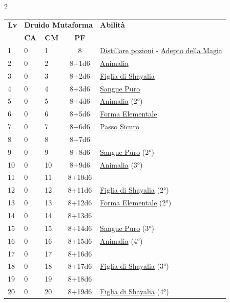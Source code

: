 {\begin{multicols}{2}


\noindent\begin{tabularx}{\linewidth}{p{0.55cm}|p{0.55cm}p{0.55cm}c|X|}
	\toprule
 \rowcolor{gray!20}	\textbf{Lv} & \multicolumn{3}{c|}{\textbf{Druido Mutaforma}} & \textbf{Abilità} \\
& \centering\arraybackslash \textbf{CA} & \centering\arraybackslash \textbf{CM} & \centering\arraybackslash \textbf{PF} & \\
	\toprule
	1 & 0 & 1 & 8 & \hyperlink{Distillare pozioni}{Distillare pozioni} - \hyperlink{Adepto della Magia}{Adepto della Magia}\\
	\rowcolor{gray!20}2 & 0 & 2 & 8+1d6 & \hyperlink{Animalia}{Animalia}\\
	3 & 0 & 3 & 8+2d6 & \hyperlink{Figlia di Shayalia}{Figlia di Shayalia}\\
	\rowcolor{gray!20}4 & 0 & 4 & 8+3d6 & \hyperlink{Sangue Puro}{Sangue Puro}\\
	5 & 0 & 5 & 8+4d6 & \hyperlink{Animalia}{Animalia} (2°)\\
	\rowcolor{gray!20}6 & 0 & 6 & 8+5d6 & \hyperlink{Forma Elementale}{Forma Elementale}\\
	7 & 0 & 7 & 8+6d6 & \hyperlink{Passo Sicuro}{Passo Sicuro}\\
	\rowcolor{gray!20}8 & 0 & 8 & 8+7d6 & \\
	9 & 0 & 9 & 8+8d6 & \hyperlink{Sangue Puro}{Sangue Puro} (2°)\\
	\rowcolor{gray!20}10 & 0 & 10 & 8+9d6 & \hyperlink{Animalia}{Animalia} (3°)\\
	11 & 0 & 11 & 8+10d6 & \\
	\rowcolor{gray!20}12 & 0 & 12 & 8+11d6 & \hyperlink{Figlia di Shayalia}{Figlia di Shayalia} (2°)\\
	13 & 0 & 13 & 8+12d6 & \hyperlink{Forma Elementale}{Forma Elementale} (2°)\\
	\rowcolor{gray!20}14 & 0 & 14 & 8+13d6 & \\
	15 & 0 & 15 & 8+14d6 & \hyperlink{Sangue Puro}{Sangue Puro} (3°)\\
	\rowcolor{gray!20}16 & 0 & 16 & 8+15d6 & \hyperlink{Animalia}{Animalia} (4°)\\
	17 & 0 & 17 & 8+16d6 & \\
	\rowcolor{gray!20}18 & 0 & 18 & 8+17d6 & \hyperlink{Figlia di Shayalia}{Figlia di Shayalia} (3°)\\
	19 & 0 & 19 & 8+18d6 & \\
	\rowcolor{gray!20}20 & 0 & 20 & 8+19d6 & \hyperlink{Figlia di Shayalia}{Figlia di Shayalia} (4°)\\
\end{tabularx}



\end{multicols}}
